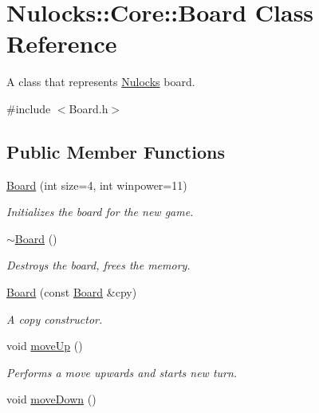 \hypertarget{class_nulocks_1_1_core_1_1_board}{\section{Nulocks\-:\-:Core\-:\-:Board Class Reference}
\label{class_nulocks_1_1_core_1_1_board}
}


A class that represents \hyperlink{namespace_nulocks}{Nulocks} board.  




{\ttfamily \#include $<$Board.\-h$>$}

\subsection*{Public Member Functions}
\begin{DoxyCompactItemize}
\item 
\hyperlink{class_nulocks_1_1_core_1_1_board_aade03ae0bbc41412df4bc7383fbd4ebc}{Board} (int size=4, int winpower=11)
\begin{DoxyCompactList}\small\item\em Initializes the board for the new game. \end{DoxyCompactList}\item 
\hypertarget{class_nulocks_1_1_core_1_1_board_a5d15ae6a1d3266b0cfea0d202d72d640}{\hyperlink{class_nulocks_1_1_core_1_1_board_a5d15ae6a1d3266b0cfea0d202d72d640}{$\sim$\-Board} ()}\label{class_nulocks_1_1_core_1_1_board_a5d15ae6a1d3266b0cfea0d202d72d640}

\begin{DoxyCompactList}\small\item\em Destroys the board, frees the memory. \end{DoxyCompactList}\item 
\hyperlink{class_nulocks_1_1_core_1_1_board_af47d4fed958c0136f59ca3295a84bb8c}{Board} (const \hyperlink{class_nulocks_1_1_core_1_1_board}{Board} \&cpy)
\begin{DoxyCompactList}\small\item\em A copy constructor. \end{DoxyCompactList}\item 
\hypertarget{class_nulocks_1_1_core_1_1_board_a76553d38f8472170a2f1a7ae76f3a73f}{void \hyperlink{class_nulocks_1_1_core_1_1_board_a76553d38f8472170a2f1a7ae76f3a73f}{move\-Up} ()}\label{class_nulocks_1_1_core_1_1_board_a76553d38f8472170a2f1a7ae76f3a73f}

\begin{DoxyCompactList}\small\item\em Performs a move upwards and starts new turn. \end{DoxyCompactList}\item 
\hypertarget{class_nulocks_1_1_core_1_1_board_aa1952b950f9c0e69c971b3ab345a43a2}{void \hyperlink{class_nulocks_1_1_core_1_1_board_aa1952b950f9c0e69c971b3ab345a43a2}{move\-Down} ()}\label{class_nulocks_1_1_core_1_1_board_aa1952b950f9c0e69c971b3ab345a43a2}


\end{DoxyCompactItemize}
